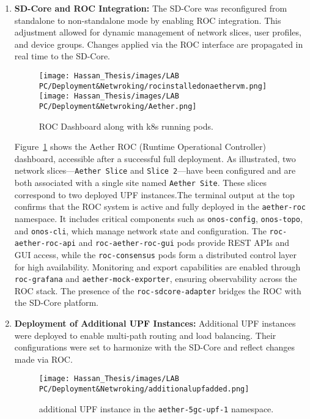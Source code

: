 \begin{enumerate}
    \item \textbf{SD-Core and ROC Integration:}  
    The SD-Core was reconfigured from standalone to non-standalone mode by enabling ROC integration. This adjustment allowed for dynamic management of network slices, user profiles, and device groups. Changes applied via the ROC interface are propagated in real time to the SD-Core.

    \begin{figure}[H]
        \centering
         \texttt{[image: Hassan\_Thesis/images/LAB PC/Deployment\&Netwroking/rocinstalledonaethervm.png]}        
        \texttt{[image: Hassan\_Thesis/images/LAB PC/Deployment\&Netwroking/Aether.png]}
        \caption{ROC Dashboard along with k8s running pods.}
        \label{fig:roc_dashboard}
    \end{figure}
    
Figure~\ref{fig:roc_dashboard} shows the Aether ROC (Runtime Operational Controller) dashboard, accessible after a successful full deployment. As illustrated, two network slices—\texttt{Aether Slice} and \texttt{Slice 2}—have been configured and are both associated with a single site named \texttt{Aether Site}. These slices correspond to two deployed UPF instances.The terminal output at the top confirms that the ROC system is active and fully deployed in the \texttt{aether-roc} namespace. It includes critical components such as \texttt{onos-config}, \texttt{onos-topo}, and \texttt{onos-cli}, which manage network state and configuration. The \texttt{roc-aether-roc-api} and \texttt{roc-aether-roc-gui} pods provide REST APIs and GUI access, while the \texttt{roc-consensus} pods form a distributed control layer for high availability. Monitoring and export capabilities are enabled through \texttt{roc-grafana} and \texttt{aether-mock-exporter}, ensuring observability across the ROC stack. The presence of the \texttt{roc-sdcore-adapter} bridges the ROC with the SD-Core platform.

    \item \textbf{Deployment of Additional UPF Instances:}  
    Additional UPF instances were deployed to enable multi-path routing and load balancing. Their configurations were set to harmonize with the SD-Core and reflect changes made via ROC.  
    \begin{figure}[H]
        \centering
        \texttt{[image: Hassan\_Thesis/images/LAB PC/Deployment\&Netwroking/additionalupfadded.png]}
        \caption{additional UPF instance in the \texttt{aether-5gc-upf-1} namespace.}
        \label{fig:multiple_upf}
    \end{figure}


\end{enumerate}
